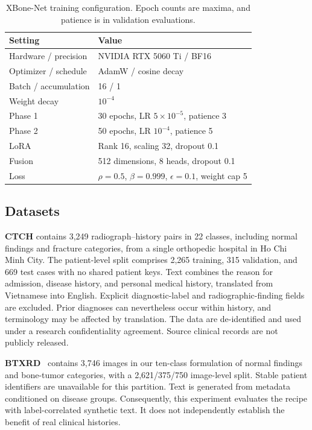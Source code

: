 \documentclass[conference,a4paper]{IEEEtran}
\begin{document}
\begin{table}[t]
\caption{XBone-Net training configuration. Epoch counts are maxima, and patience is in validation evaluations.}
\label{tab:setup}
\centering\footnotesize
\begin{tabularx}{\columnwidth}{@{}lY@{}}
\toprule
Setting & Value \\
\midrule
Hardware / precision & NVIDIA RTX 5060 Ti / BF16 \\
Optimizer / schedule & AdamW / cosine decay \\
Batch / accumulation & 16 / 1 \\
Weight decay & $10^{-4}$ \\
Phase 1 & 30 epochs, LR $5\times10^{-5}$, patience 3 \\
Phase 2 & 50 epochs, LR $10^{-4}$, patience 5 \\
LoRA & Rank 16, scaling 32, dropout 0.1 \\
Fusion & 512 dimensions, 8 heads, dropout 0.1 \\
Loss & $\rho=0.5$, $\beta=0.999$, $\epsilon=0.1$, weight cap 5 \\
\bottomrule
\end{tabularx}
\end{table}

\subsection{Datasets}
\textbf{CTCH} contains 3,249 radiograph--history pairs in 22 classes, including normal findings and fracture categories, from a single orthopedic hospital in Ho Chi Minh City. The patient-level split comprises 2,265 training, 315 validation, and 669 test cases with no shared patient keys. Text combines the reason for admission, disease history, and personal medical history, translated from Vietnamese into English. Explicit diagnostic-label and radiographic-finding fields are excluded. Prior diagnoses can nevertheless occur within history, and terminology may be affected by translation. The data are de-identified and used under a research confidentiality agreement. Source clinical records are not publicly released.

\textbf{BTXRD}~\cite{Yao2025} contains 3,746 images in our ten-class formulation of normal findings and bone-tumor categories, with a 2,621/375/750 image-level split. Stable patient identifiers are unavailable for this partition. Text is generated from metadata conditioned on disease groups. Consequently, this experiment evaluates the recipe with label-correlated synthetic text. It does not independently establish the benefit of real clinical histories.
\end{document}
